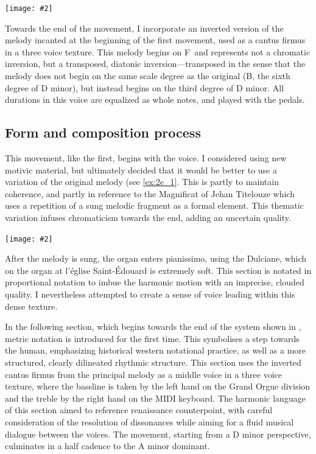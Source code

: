 \documentclass[12pt,twoside,maitrise]{dms_ks}
\newcommand{\customincludeexamples}[4][]{%
    \begin{example}[H]
        \centering
        \texttt{[image: \#2]}
        \caption{#4}
	\label{#3} 
    \end{example}
}
\theoremstyle{definition}
\begin{document}
{\customincludeexamples[]{g7alt}{fig:g7alt}{A classic G7alt chord on the left, and my variation with a \sh7 on the right.}

Towards the end of the movement, I incorporate an inverted version of the melody incanted at the beginning of the first movement, used as a cantus firmus in a three voice texture.
This melody begins on F\na\ and represents not a chromatic inversion, but a transposed, diatonic inversion---transposed in the sense that the melody does not begin on the same scale degree as the original (B\fl, the sixth degree of D minor), but instead begins on the third degree of D minor. 
All durations in this voice are equalized as whole notes, and played with the pedals.

\subsection{Form and composition process}

This movement, like the first, begins with the voice.
I considered using new motivic material, but ultimately decided that it would be better to use a variation of the original melody (see \cref{ex:2e_1}.
This is partly to maintain coherence, and partly in reference to the Magnificat of Jehan Titelouze which uses a repetition of a sung melodic fragment as a formal element.
This thematic variation infuses chromaticism towards the end, adding an uncertain quality.

\customincludeexamples[width=\textwidth]{2e_1}{ex:2e_1}{A variation of the sung melody from the first movement (p.~2, sys.~1).}

After the melody is sung, the organ enters pianissimo, using the Dulciane, which on the organ at l'église Saint-Édouard is extremely soft.
This section is notated in proportional notation to imbue the harmonic motion with an imprecise, clouded quality.
I nevertheless attempted to create a sense of voice leading within this dense texture.

In the following section, which begins towards the end of the system shown in , metric notation is introduced for the first time.
This symbolises a step towards the human, emphasizing historical western notational practice, as well as a more structured, clearly dilineated rhythmic structure. 
This section uses the inverted cantus firmus from the principal melody as a middle voice in a three voice texture, where the bassline is taken by the left hand on the Grand Orgue division and the treble by the right hand on the MIDI keyboard.
The harmonic language of this section aimed to reference renaissance counterpoint, with careful consideration of the resolution of dissonances while aiming for a fluid musical dialogue between the voices.
The movement, starting from a D minor perspective, culminates in a half cadence to the A minor dominant.

}
\end{document}
